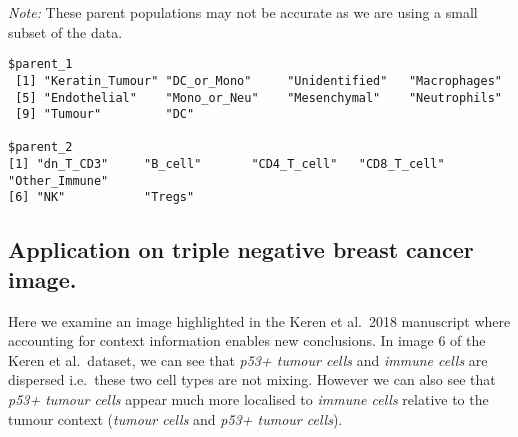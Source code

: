 \documentclass[
  letterpaper,
  DIV=11,
  numbers=noendperiod]{scrreprt}
\newenvironment{Shaded}{\begin{snugshade}}{\end{snugshade}}
\newcommand{\AttributeTok}[1]{\textcolor[rgb]{0.40,0.45,0.13}{#1}}
\newcommand{\CommentTok}[1]{\textcolor[rgb]{0.37,0.37,0.37}{#1}}
\newcommand{\DecValTok}[1]{\textcolor[rgb]{0.68,0.00,0.00}{#1}}
\newcommand{\FunctionTok}[1]{\textcolor[rgb]{0.28,0.35,0.67}{#1}}
\newcommand{\NormalTok}[1]{\textcolor[rgb]{0.00,0.23,0.31}{#1}}
\newcommand{\OtherTok}[1]{\textcolor[rgb]{0.00,0.23,0.31}{#1}}
\newcommand{\SpecialCharTok}[1]{\textcolor[rgb]{0.37,0.37,0.37}{#1}}
\newcommand{\StringTok}[1]{\textcolor[rgb]{0.13,0.47,0.30}{#1}}
\begin{document}
\emph{Note:} These parent populations may not be accurate as we are
using a small subset of the data.

\begin{Shaded}
\end{Shaded}

\begin{verbatim}
$parent_1
 [1] "Keratin_Tumour" "DC_or_Mono"     "Unidentified"   "Macrophages"   
 [5] "Endothelial"    "Mono_or_Neu"    "Mesenchymal"    "Neutrophils"   
 [9] "Tumour"         "DC"            

$parent_2
[1] "dn_T_CD3"     "B_cell"       "CD4_T_cell"   "CD8_T_cell"   "Other_Immune"
[6] "NK"           "Tregs"       
\end{verbatim}

\subsection{Application on triple negative breast cancer
image.}\label{application-on-triple-negative-breast-cancer-image.}

Here we examine an image highlighted in the Keren et al.~2018 manuscript
where accounting for context information enables new conclusions. In
image 6 of the Keren et al.~dataset, we can see that \emph{p53+ tumour
cells} and \emph{immune cells} are dispersed i.e.~these two cell types
are not mixing. However we can also see that \emph{p53+ tumour cells}
appear much more localised to \emph{immune cells} relative to the tumour
context (\emph{tumour cells} and \emph{p53+ tumour cells}).
\end{document}
